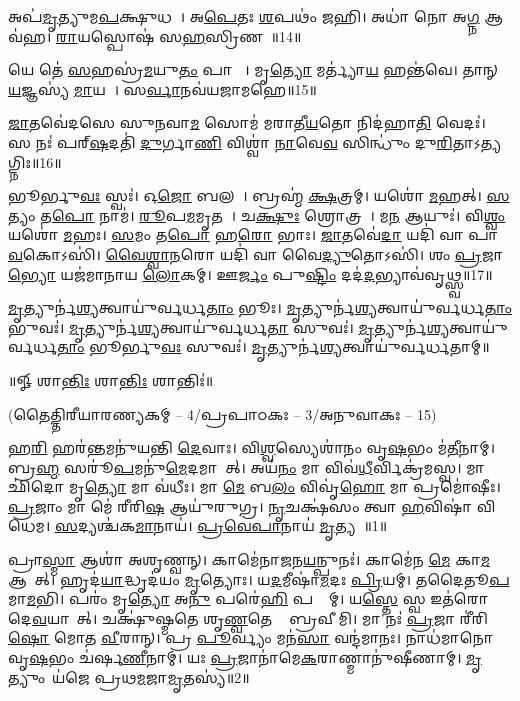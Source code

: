 𑌅𑌪॑\ul{𑌮𑍃}𑌤𑍍𑌯𑍁𑌮\ul{𑌪}𑌕𑍍𑌷𑍁𑌧𑌮𑍍᳚।   𑌅\ul{𑌪𑍇}𑌤𑌃 \ul{𑌶}𑌪𑌥𑌂॑ 𑌜𑌹𑌿।
𑌅𑌧𑌾॑ 𑌨𑍋 𑌅\ul{𑌗𑍍𑌨} 𑌆𑌵॑𑌹।   \ul{𑌰𑌾}𑌯𑌸𑍍𑌪𑍋𑌷॑ 𑌸\ul{𑌹}𑌸𑍍𑌰𑌿𑌣𑌮𑍍᳚॥14॥

𑌯𑍇 𑌤𑍇॑ \ul{𑌸}𑌹𑌸𑍍𑌰॑\ul{𑌮}𑌯𑍁\ul{𑌤𑌂} 𑌪𑌾𑌶𑌾𑌃᳚।   𑌮𑍃\ul{𑌤𑍍𑌯𑍋} 𑌮𑌰𑍍𑌤𑍍𑌯𑌾॑\ul{𑌯} 𑌹𑌨𑍍𑌤॑𑌵𑍇।
𑌤𑌾𑌨𑍍 \ul{𑌯}𑌜𑍍𑌞𑌸𑍍𑌯॑ \ul{𑌮𑌾}𑌯𑌯𑌾᳚।   𑌸\ul{𑌰𑍍𑌵𑌾}𑌨𑌵॑𑌯𑌜𑌾𑌮𑌹𑍇॥15॥

\ul{𑌜𑌾}𑌤𑌵𑍇॑𑌦𑌸𑍇 𑌸𑍁𑌨𑌵𑌾\ul{𑌮} 𑌸𑍋𑌮॑ 𑌮𑌰𑌾𑌤𑍀\ul{𑌯}𑌤𑍋 𑌨𑌿𑌦॑𑌹𑌾\ul{𑌤𑌿} 𑌵𑍇𑌦𑌃॑।
𑌸 𑌨𑌃॑ 𑌪𑌰𑍍‌\ul{𑌷}𑌦𑌤𑌿॑ \ul{𑌦𑍁}𑌰𑍍𑌗𑌾\ul{𑌣𑌿} 𑌵𑌿𑌶𑍍𑌵𑌾॑ \ul{𑌨𑌾}𑌵𑍇\ul{𑌵} 𑌸𑌿𑌨𑍍𑌧𑍁𑌂॑ 𑌦𑍁\ul{𑌰𑌿}𑌤𑌾𑌽\ul{𑌤𑍍𑌯}𑌗𑍍𑌨𑌿𑌃॥16॥

𑌭𑍂𑌰𑍍𑌭𑍁\ul{𑌵𑌃} 𑌸𑍍𑌵𑌃॑।
𑌓\ul{𑌜𑍋} 𑌬𑌲𑌮𑍍᳚।
𑌬𑍍𑌰𑌹𑍍𑌮॑ \ul{𑌕𑍍𑌷}𑌤𑍍𑌰𑌮𑍍।
𑌯𑌶𑍋॑ \ul{𑌮}𑌹𑌤𑍍।
\ul{𑌸}𑌤𑍍𑌯𑌂 𑌤\ul{𑌪𑍋} 𑌨𑌾𑌮॑।
\ul{𑌰𑍂}𑌪\ul{𑌮}𑌮𑍃𑌤𑌮𑍍᳚।
𑌚\ul{𑌕𑍍𑌷𑍁𑌃} 𑌶𑍍𑌰𑍋𑌤𑍍𑌰𑌮𑍍᳚।
𑌮\ul{𑌨} 𑌆𑌯𑍁𑌃॑।
𑌵𑌿\ul{𑌶𑍍𑌵𑌂} 𑌯𑌶𑍋॑ \ul{𑌮}𑌹𑌃।
\ul{𑌸}𑌮𑌂 𑌤\ul{𑌪𑍋} 𑌹\ul{𑌰𑍋} 𑌭𑌾𑌃।
\ul{𑌜𑌾}𑌤𑌵𑍇॑\ul{𑌦𑌾} 𑌯𑌦𑌿॑ 𑌵𑌾 𑌪𑌾\ul{𑌵}𑌕𑍋𑌽𑌸𑌿॑।
\ul{𑌵𑍈}\ul{𑌶𑍍𑌵𑌾}\ul{𑌨}𑌰𑍋 𑌯𑌦𑌿॑ 𑌵𑌾 𑌵𑍈\ul{𑌦𑍍𑌯𑍁}𑌤𑍋𑌽𑌸𑌿॑।
𑌶𑌂 \ul{𑌪𑍍𑌰}𑌜𑌾\ul{𑌭𑍍𑌯𑍋} 𑌯𑌜॑𑌮𑌾𑌨𑌾𑌯 \ul{𑌲𑍋}𑌕𑌮𑍍।
𑌊\ul{𑌰𑍍𑌜𑌂} 𑌪𑍁\ul{𑌷𑍍𑌟𑌿𑌂} 𑌦𑌦॑\ul{𑌦}𑌭𑍍𑌯𑌾𑌵॑𑌵𑍃𑌥𑍍𑌸𑍍𑌵॥17॥
   
\ul{𑌮𑍃}𑌤𑍍𑌯𑍁𑌰𑍍𑌨॑\ul{𑌶𑍍𑌯}𑌤𑍍𑌵𑌾𑌯𑍁॑𑌰𑍍𑌵𑌰𑍍𑌧\ul{𑌤𑌾𑌂} 𑌭𑍂𑌃।
\ul{𑌮𑍃}𑌤𑍍𑌯𑍁𑌰𑍍𑌨॑\ul{𑌶𑍍𑌯}𑌤𑍍𑌵𑌾𑌯𑍁॑𑌰𑍍𑌵𑌰𑍍𑌧\ul{𑌤𑌾𑌂} 𑌭𑍁𑌵𑌃॑।
\ul{𑌮𑍃}𑌤𑍍𑌯𑍁𑌰𑍍𑌨॑\ul{𑌶𑍍𑌯}𑌤𑍍𑌵𑌾𑌯𑍁॑𑌰𑍍𑌵𑌰𑍍𑌧\ul{𑌤𑌾}\ul{} 𑌸𑍁𑌵𑌃॑।
\ul{𑌮𑍃}𑌤𑍍𑌯𑍁𑌰𑍍𑌨॑\ul{𑌶𑍍𑌯}𑌤𑍍𑌵𑌾𑌯𑍁॑𑌰𑍍𑌵𑌰𑍍𑌧\ul{𑌤𑌾𑌂} 𑌭𑍂𑌰𑍍𑌭𑍁\ul{𑌵𑌃} 𑌸𑍁𑌵𑌃॑।
\ul{𑌮𑍃}𑌤𑍍𑌯𑍁𑌰𑍍𑌨॑\ul{𑌶𑍍𑌯}𑌤𑍍𑌵𑌾𑌯𑍁॑𑌰𑍍𑌵𑌰𑍍𑌧𑌤𑌾𑌮𑍍॥

\centerline{॥𑍐 𑌶𑌾\ul{𑌨𑍍𑌤𑌿𑌃} 𑌶𑌾\ul{𑌨𑍍𑌤𑌿𑌃} 𑌶𑌾𑌨𑍍𑌤𑌿𑌃॑॥}
\let\parskip\oldparskip

\closesection
\centerline{\normalsize (𑌤𑍈𑌤𑍍𑌤𑌿𑌰𑍀𑌯𑌾𑌰𑌣𑍍𑌯𑌕𑌮𑍍 – 4/𑌪𑍍𑌰𑌪𑌾𑌠𑌕𑌃 – 3/𑌅𑌨𑍁𑌵𑌾𑌕𑌃 – 15)}
𑌹\ul{𑌰𑌿}\ul{} 𑌹𑌰॑\ul{𑌨𑍍𑌤}𑌮𑌨𑍁॑𑌯𑌨𑍍𑌤𑌿 \ul{𑌦𑍇}𑌵𑌾𑌃। 𑌵𑌿\ul{𑌶𑍍𑌵}𑌸𑍍𑌯𑍇𑌶𑌾॑𑌨𑌂 𑌵𑍃\ul{𑌷}𑌭𑌂 𑌮॑\ul{𑌤𑍀}𑌨𑌾𑌮𑍍। 𑌬𑍍𑌰\ul{𑌹𑍍𑌮} 𑌸𑌰𑍂॑\ul{𑌪}𑌮𑌨𑍁॑\ul{𑌮𑍇}𑌦𑌮𑌾𑌗𑌾᳚𑌤𑍍। 𑌅𑌯॑\ul{𑌨𑌂} 𑌮𑌾 𑌵𑌿𑌵॑\ul{𑌧𑍀}𑌰𑍍𑌵𑌿𑌕𑍍𑌰॑𑌮𑌸𑍍𑌵। 𑌮𑌾 𑌛𑌿॑𑌦𑍋 𑌮𑍃\ul{𑌤𑍍𑌯𑍋} 𑌮𑌾 𑌵॑𑌧𑍀𑌃। 𑌮𑌾 \ul{𑌮𑍇} 𑌬\ul{𑌲𑌂}  𑌵𑌿𑌵𑍃॑\ul{𑌹𑍋} 𑌮𑌾 𑌪𑍍𑌰𑌮𑍋॑𑌷𑍀𑌃। \ul{𑌪𑍍𑌰}𑌜𑌾𑌂 𑌮𑌾 𑌮𑍇॑ 𑌰𑍀𑌰𑌿\ul{𑌷} 𑌆𑌯𑍁॑𑌰𑍁𑌗𑍍𑌰। \ul{𑌨𑍃}𑌚𑌕𑍍𑌷॑𑌸𑌂 𑌤𑍍𑌵𑌾 \ul{𑌹}𑌵𑌿𑌷𑌾॑ 𑌵𑌿𑌧𑍇𑌮। \ul{𑌸}𑌦𑍍𑌯𑌶𑍍𑌚॑𑌕\ul{𑌮𑌾}𑌨𑌾𑌯॑। \ul{𑌪𑍍𑌰}\ul{𑌵𑍇}\ul{𑌪𑌾}𑌨𑌾𑌯॑ \ul{𑌮𑍃}𑌤𑍍𑌯𑌵𑍇᳚॥1॥

𑌪𑍍𑌰𑌾\ul{𑌸𑍍𑌮𑌾} 𑌆𑌶𑌾॑ 𑌅𑌶𑍃𑌣𑍍𑌵𑌨𑍍। 𑌕𑌾𑌮𑍇॑𑌨𑌾𑌜𑌨\ul{𑌯}𑌨𑍍𑌪𑍁𑌨𑌃॑। 𑌕𑌾𑌮𑍇॑𑌨 \ul{𑌮𑍇} 𑌕𑌾\ul{𑌮} 𑌆𑌗𑌾᳚𑌤𑍍। 𑌹𑍃𑌦॑\ul{𑌯𑌾}𑌦𑍍𑌧𑍃𑌦॑𑌯𑌂 \ul{𑌮𑍃}𑌤𑍍𑌯𑍋𑌃। 𑌯\ul{𑌦}𑌮𑍀𑌷𑌾॑\ul{𑌮}𑌦𑌃 \ul{𑌪𑍍𑌰𑌿}𑌯𑌮𑍍। 𑌤𑌦𑍈𑌤𑍂\ul{𑌪}𑌮𑌾\ul{𑌮}𑌭𑌿। 𑌪𑌰𑌂॑ 𑌮𑍃\ul{𑌤𑍍𑌯𑍋} 𑌅\ul{𑌨𑍁} 𑌪𑌰𑍇॑\ul{𑌹𑌿} 𑌪𑌨𑍍𑌥𑌾᳚𑌮𑍍। 𑌯\ul{𑌸𑍍𑌤𑍇} 𑌸𑍍𑌵 𑌇𑌤॑𑌰𑍋 𑌦𑍇\ul{𑌵}𑌯𑌾𑌨𑌾᳚𑌤𑍍। 𑌚𑌕𑍍𑌷𑍁॑𑌷𑍍𑌮𑌤𑍇 𑌶𑍃\ul{𑌣𑍍𑌵}𑌤𑍇 𑌤𑍇᳚ 𑌬𑍍𑌰𑌵𑍀𑌮𑌿। 𑌮𑌾 𑌨𑌃॑ \ul{𑌪𑍍𑌰}𑌜𑌾 𑌰𑍀॑𑌰𑌿\ul{𑌷𑍋} 𑌮𑍋𑌤 \ul{𑌵𑍀}𑌰𑌾𑌨𑍍। 𑌪𑍍𑌰 \ul{𑌪𑍂}𑌰𑍍𑌵𑍍𑌯𑌂 𑌮𑌨॑\ul{𑌸𑌾} 𑌵𑌨𑍍𑌦॑𑌮𑌾𑌨𑌃। 𑌨𑌾𑌧॑𑌮𑌾𑌨𑍋 𑌵𑍃\ul{𑌷}𑌭𑌂 𑌚॑𑌰𑍍\mbox{}𑌷\ul{𑌣𑍀}𑌨𑌾𑌮𑍍। 𑌯𑌃 \ul{𑌪𑍍𑌰}𑌜𑌾𑌨𑌾॑𑌮𑍇\ul{𑌕}𑌰𑌾𑌣𑍍𑌮𑌾𑌨𑍁॑𑌷𑍀𑌣𑌾𑌮𑍍। \ul{𑌮𑍃}𑌤𑍍𑌯𑍁𑌂 𑌯॑𑌜𑍇 𑌪𑍍𑌰𑌥\ul{𑌮}𑌜𑌾\ul{𑌮𑍃}𑌤𑌸𑍍𑌯॑॥2॥
